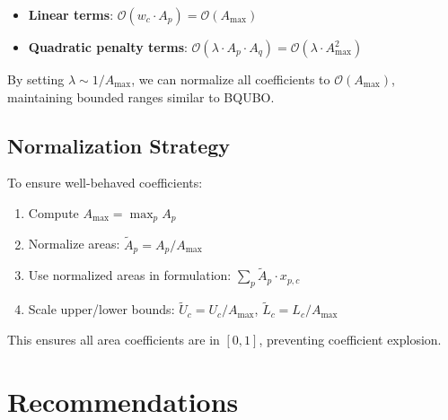 \documentclass[11pt,a4paper]{article}
\begin{document}
\begin{itemize}
    \item \textbf{Linear terms}: $\mathcal{O}(w_c \cdot A_p) = \mathcal{O}(A_{\text{max}})$
    \item \textbf{Quadratic penalty terms}: $\mathcal{O}(\lambda \cdot A_p \cdot A_q) = \mathcal{O}(\lambda \cdot A_{\text{max}}^2)$
\end{itemize}

By setting $\lambda \sim 1/A_{\text{max}}$, we can normalize all coefficients to $\mathcal{O}(A_{\text{max}})$, maintaining bounded ranges similar to BQUBO.

\subsection{Normalization Strategy}

To ensure well-behaved coefficients:

\begin{enumerate}
    \item Compute $A_{\text{max}} = \max_p A_p$
    \item Normalize areas: $\tilde{A}_p = A_p / A_{\text{max}}$
    \item Use normalized areas in formulation: $\sum_p \tilde{A}_p \cdot x_{p,c}$
    \item Scale upper/lower bounds: $\tilde{U}_c = U_c / A_{\text{max}}$, $\tilde{L}_c = L_c / A_{\text{max}}$
\end{enumerate}

This ensures all area coefficients are in $[0, 1]$, preventing coefficient explosion.

\section{Recommendations}
\end{document}
